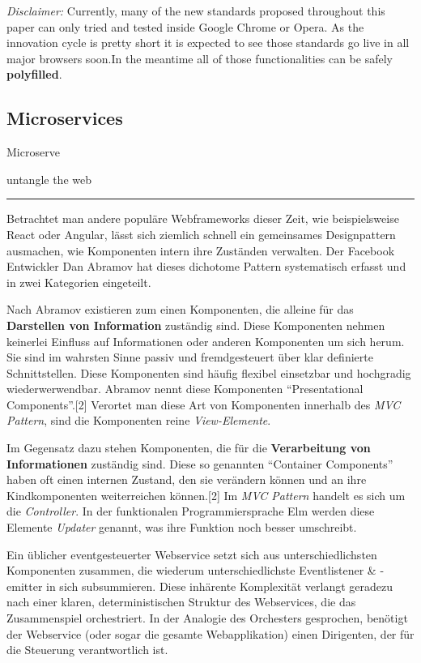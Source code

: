 \documentclass[]{assets/latex/ieee}
\begin{document}
\emph{Disclaimer:} Currently, many of the new standards proposed
throughout this paper can only tried and tested inside Google Chrome or
Opera. As the innovation cycle is pretty short it is expected to see
those standards go live in all major browsers soon.In the meantime all
of those functionalities can be safely \textbf{polyfilled}.

\subsection{Microservices}\label{microservices}

Microserve

untangle the web

\begin{center}\rule{0.5\linewidth}{\linethickness}\end{center}

Betrachtet man andere populäre Webframeworks dieser Zeit, wie
beispielsweise React oder Angular, lässt sich ziemlich schnell ein
gemeinsames Designpattern ausmachen, wie Komponenten intern ihre
Zuständen verwalten. Der Facebook Entwickler Dan Abramov hat dieses
dichotome Pattern systematisch erfasst und in zwei Kategorien
eingeteilt.

Nach Abramov existieren zum einen Komponenten, die alleine für das
\textbf{Darstellen von Information} zuständig sind. Diese Komponenten
nehmen keinerlei Einfluss auf Informationen oder anderen Komponenten um
sich herum. Sie sind im wahrsten Sinne passiv und fremdgesteuert über
klar definierte Schnittstellen. Diese Komponenten sind häufig flexibel
einsetzbar und hochgradig wiederwerwendbar. Abramov nennt diese
Komponenten ``Presentational Components''.{[}2{]} Verortet man diese Art
von Komponenten innerhalb des \emph{MVC Pattern}, sind die Komponenten
reine \emph{View-Elemente}.

Im Gegensatz dazu stehen Komponenten, die für die \textbf{Verarbeitung
von Informationen} zuständig sind. Diese so genannten ``Container
Components'' haben oft einen internen Zustand, den sie verändern können
und an ihre Kindkomponenten weiterreichen können.{[}2{]} Im \emph{MVC
Pattern} handelt es sich um die \emph{Controller}. In der funktionalen
Programmiersprache Elm werden diese Elemente \emph{Updater} genannt, was
ihre Funktion noch besser umschreibt.

Ein üblicher eventgesteuerter Webservice setzt sich aus
unterschiedlichsten Komponenten zusammen, die wiederum
unterschiedlichste Eventlistener \& -emitter in sich subsummieren. Diese
inhärente Komplexität verlangt geradezu nach einer klaren,
deterministischen Struktur des Webservices, die das Zusammenspiel
orchestriert. In der Analogie des Orchesters gesprochen, benötigt der
Webservice (oder sogar die gesamte Webapplikation) einen Dirigenten, der
für die Steuerung verantwortlich ist.
\end{document}
